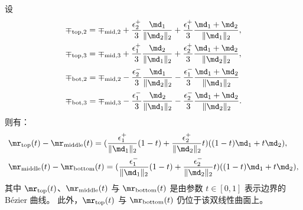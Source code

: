 \begin{prop}\label{prop:mid2topbase}
    设
    \begin{align*}
       & \mp_{\text{top},2} = \mp_{\text{mid},2} + \frac{\epsilon_2^{+}}{3} \frac{\md_1}{\|\md_2\|_2} + \frac{\epsilon_1^{+}}{3}\frac{\md_1+\md_2}{\|\md_1\|_2}, \\
       &\mp_{\text{top},3} = \mp_{\text{mid},3} + \frac{\epsilon_1^{+}}{3} \frac{\md_2}{\|\md_1\|_2} + \frac{\epsilon_2^{+}}{3}\frac{\md_1+\md_2}{\|\md_2\|_2}, \\
       & \mp_{\text{bot},2} = \mp_{\text{mid},2} - \frac{\epsilon_2^{-}}{3} \frac{\md_1}{\|\md_2\|_2} - \frac{\epsilon_1^{-}}{3}\frac{\md_1+\md_2}{\|\md_1\|_2} \\
       & \mp_{\text{bot},3} =\mp_{\text{mid},3} - \frac{\epsilon_1^{-}}{3} \frac{\md_2}{\|\md_1\|_2} - \frac{\epsilon_2^{-}}{3}\frac{\md_1+\md_2}{\|\md_2\|_2}.
    \end{align*}
    则有：
    \begin{align*}
       & \mr_\text{top}(t) - \mr_\text{middle}(t) = (\frac{\epsilon_1^{+}}{\|\md_1\|_2}(1-t)+\frac{\epsilon_2^{+}}{\|\md_2\|_2}t)((1-t)\md_1 + t\md_2), \\
       &\mr_\text{middle}(t) - \mr_\text{bottom}(t) = (\frac{\epsilon_1^{-}}{\|\md_1\|_2}(1-t)+\frac{\epsilon_2^{-}}{\|\md_2\|_2}t)((1-t)\md_1 + t\md_2),
    \end{align*}
    其中 $\mr_\text{top}(t)$、$\mr_\text{middle}(t)$ 与 $\mr_\text{bottom}(t)$ 是由参数 $t \in [0,1]$ 表示边界的 B\'{e}zier 曲线。
    此外，$\mr_\text{top}(t)$ 与 $\mr_\text{bottom}(t)$ 仍位于该双线性曲面上。
\end{prop}
